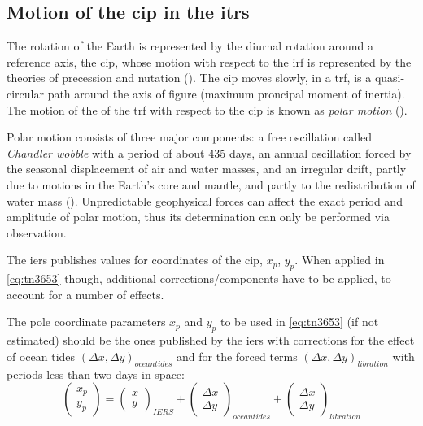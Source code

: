 \subsection{Motion of the \gls{cip} in the \gls{itrs}}
\label{ssec:motion-of-the-cip-in-the-itrs}
The rotation of the Earth is represented by the diurnal rotation around a reference 
axis, the \gls{cip}, whose motion with respect to the \gls{irf} is represented 
by the theories of precession and nutation (\cite{esaa13}). The \gls{cip} moves 
slowly, in a \gls{trf}, is a quasi-circular path around the axis of figure (maximum 
proncipal moment of inertia). The motion of the of the \gls{trf} with respect to 
the \gls{cip} is known as \emph{polar motion} (\cite{esaa13}).

Polar motion consists of three major components: a free oscillation called 
\emph{Chandler wobble} with a period of about 435 days, an annual oscillation 
forced by the seasonal displacement of air and water masses, and an irregular 
drift, partly due to motions in the Earth's core and mantle, and partly to the 
redistribution of water mass (\cite{iersPolarmotionWs}). Unpredictable geophysical forces can 
affect the exact period and amplitude of polar motion, thus its determination 
can only be performed via observation.

The \gls{iers} publishes values for coordinates of the \gls{cip}, \(x_p\), \(y_p\).
When applied in \ref{eq:tn3653} though, additional corrections/components have 
to be applied, to account for a number of effects.

The pole coordinate parameters \(x_p \) and \(y_p\) to be used in \ref{eq:tn3653} 
(if not estimated) should be the ones published by the \gls{iers} with corrections 
for the effect of ocean tides \((\Delta x , \Delta y )_{ocean tides} \) and for the 
forced terms \((\Delta x , \Delta y )_{libration} \) with periods less than two 
days in space:
\begin{equation}
  \label{eq:tn36511}
  \begin{pmatrix}
    x_p \\
    y_p
  \end{pmatrix}
  =
  \begin{pmatrix}
    x \\
    y
  \end{pmatrix} _{IERS}
  +
  \begin{pmatrix}
  \Delta x \\
  \Delta y
  \end{pmatrix} _{ocean tides}
  +
  \begin{pmatrix}
  \Delta x \\
  \Delta y
  \end{pmatrix} _{libration}
\end{equation}


